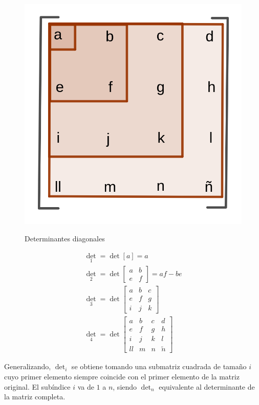\documentclass{article}
\begin{document}
\begin{figure}[ht]
\caption{Determinantes diagonales}
\includegraphics[scale=0.8]{img/teo_fig011_detdiag.png} 
\centering
\label{fig:detdiag}
\end{figure}

\begin{gather}
\det_1 = \det [a] = a \\
\det_2 = \det \begin{bmatrix} a & b \\ e & f \end{bmatrix} = a f - b e \\
\det_3 = \det \begin{bmatrix} a & b & c \\ e & f & g \\ i & j & k \end{bmatrix} \\
\det_4 = \det \begin{bmatrix} a & b & c & d \\ e & f & g & h \\ i & j & k & l \\ ll & m & n & \tilde{n} \end{bmatrix}
\end{gather}

Generalizando, $\det_i$ se obtiene tomando una submatriz cuadrada de tamaño $i$ cuyo primer elemento siempre coincide con el primer elemento de la matriz original. El subíndice $i$ va de $1$ a $n$, siendo $\det_n$ equivalente al determinante de la matriz completa.
\end{document}
